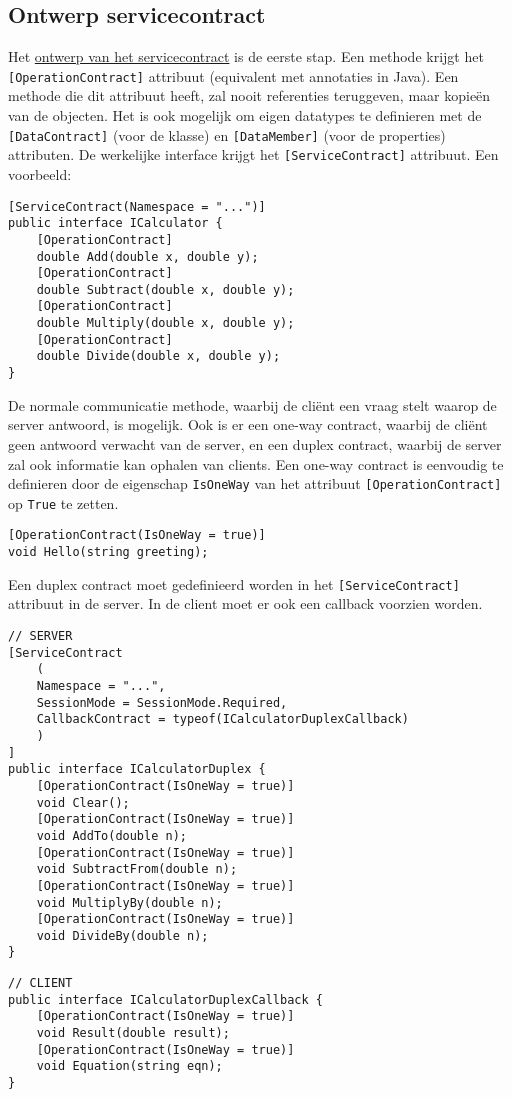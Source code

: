 \documentclass{report}
\begin{document}
\subsection{Ontwerp servicecontract}
Het \underline{ontwerp van het servicecontract} is de eerste stap. Een methode krijgt het \texttt{[OperationContract]} attribuut (equivalent met annotaties in Java). Een methode die dit attribuut heeft, zal nooit referenties teruggeven, maar kopieën van de objecten. Het is ook mogelijk om eigen datatypes te definieren met de \texttt{[DataContract]} (voor de klasse) en \texttt{[DataMember]} (voor de properties) attributen. De werkelijke interface krijgt het \texttt{[ServiceContract]} attribuut. Een voorbeeld:
\begin{lstlisting}[style=csharp]
[ServiceContract(Namespace = "...")]
public interface ICalculator {
	[OperationContract]
	double Add(double x, double y);
	[OperationContract]
	double Subtract(double x, double y);
	[OperationContract]
	double Multiply(double x, double y);
	[OperationContract]
	double Divide(double x, double y);
}
\end{lstlisting}
De normale communicatie methode, waarbij de cliënt een vraag stelt waarop de server antwoord, is mogelijk. Ook is er een one-way contract, waarbij de cliënt geen antwoord verwacht van de server, en een duplex contract, waarbij de server zal ook informatie kan ophalen van clients. Een one-way contract is eenvoudig te definieren door de eigenschap \texttt{IsOneWay} van het attribuut \texttt{[OperationContract]} op \texttt{True} te zetten. 
\begin{lstlisting}[style=csharp]
[OperationContract(IsOneWay = true)]
void Hello(string greeting);
\end{lstlisting}


Een duplex contract moet gedefinieerd worden in het \texttt{[ServiceContract]} attribuut in de server. In de client moet er ook een callback voorzien worden.
\begin{lstlisting}[style=csharp]
	// SERVER
[ServiceContract
	(
	Namespace = "...", 
	SessionMode = SessionMode.Required,
	CallbackContract = typeof(ICalculatorDuplexCallback)
	)
]
public interface ICalculatorDuplex {
	[OperationContract(IsOneWay = true)]
	void Clear();
	[OperationContract(IsOneWay = true)]
	void AddTo(double n);
	[OperationContract(IsOneWay = true)]
	void SubtractFrom(double n);
	[OperationContract(IsOneWay = true)]
	void MultiplyBy(double n);
	[OperationContract(IsOneWay = true)]
	void DivideBy(double n);
}
\end{lstlisting}
\begin{lstlisting}[style=csharp]
	// CLIENT
public interface ICalculatorDuplexCallback {
	[OperationContract(IsOneWay = true)]
	void Result(double result);
	[OperationContract(IsOneWay = true)]
	void Equation(string eqn);
}
\end{lstlisting}
\end{document}

